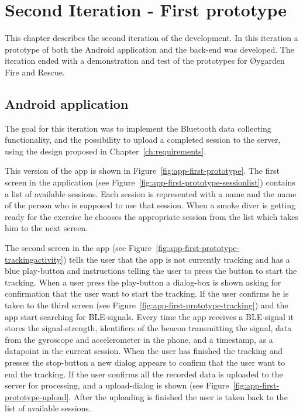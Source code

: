 \documentclass[../Main/thesis.tex]{subfiles}
\begin{document}
\chapter{Second Iteration  - First prototype}
\label{ch:development-1}
This chapter describes the second iteration of the development.
In this iteration a prototype of both the Android application and the back-end was developed.
The iteration ended with a demonstration and test of the prototypes for Øygarden Fire and Rescue.

\section{Android application}
The goal for this iteration was to implement the Bluetooth data collecting functionality, and the possibility to upload a completed session to the server, using the design proposed in Chapter~\ref{ch:requirements}.

This version of the app is shown in Figure~\ref{fig:app-first-prototype}.
The first screen in the application (see Figure~\ref{fig:app-first-prototype-sessionlist}) contains a list of available sessions. 
Each session is represented with a name and the name of the person who is supposed to use that session.
When a smoke diver is getting ready for the exercise he chooses the appropriate session from the list which takes him to the next screen.

The second screen in the app (see Figure~\ref{fig:app-first-prototype-trackingactivity}) tells the user that the app is not currently tracking and has a blue play-button and instructions telling the user to press the button to start the tracking.
When a user press the play-button a dialog-box is shown asking for confirmation that the user want to start the tracking. 
If the user confirms he is taken to the third screen (see Figure~\ref{fig:app-first-prototype-tracking}) and the app start searching for BLE-signals.
Every time the app receives a BLE-signal it stores the signal-strength, identifiers of the beacon transmitting the signal, data from the gyroscope and accelerometer in the phone, and a timestamp, as a datapoint in the current session.
When the user has finished the tracking and presses the stop-button a new dialog appears to confirm that the user want to end the tracking.
If the user confirms all the recorded data is uploaded to the server for processing, and a upload-dialog is shown (see Figure~\ref{fig:app-first-prototype-upload}.
After the uploading is finished the user is taken back to the list of available sessions.
\end{document}
